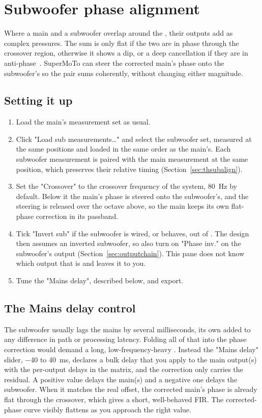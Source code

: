 \section{Subwoofer phase alignment}\label{sec:subalign}
Where a main and a subwoofer overlap around the , their outputs add as complex pressures. The sum is only flat if the two are in phase through the crossover region, otherwise it shows a dip, or a deep cancellation if they are in anti-phase~\cite{Linkwitz1976}. SuperMoTo can steer the corrected main's phase onto the subwoofer's so the pair sums coherently, without changing either magnitude.

\subsection{Setting it up}
\begin{enumerate}[nosep]
  \item Load the main's measurement set as usual.
  \item Click "Load sub measurements\ldots" and select the subwoofer set, measured at the same positions and loaded in the same order as the main's. Each subwoofer measurement is paired with the main measurement at the same position, which preserves their relative timing (Section~\ref{sec:thsubalign}).
  \item Set the "Crossover" to the crossover frequency of the system, \SI{80}{\hertz} by default. Below it the main's phase is steered onto the subwoofer's, and the steering is released over the octave above, so the main keeps its own flat-phase correction in its passband.
  \item Tick "Invert sub" if the subwoofer is wired, or behaves, out of . The design then assumes an inverted subwoofer, so also turn on "Phase inv." on the subwoofer's output (Section~\ref{sec:outputchain}). This pane does not know which output that is and leaves it to you.
  \item Tune the "Mains delay", described below, and export.
\end{enumerate}

\subsection{The Mains delay control}\label{sec:timealign}
The subwoofer usually lags the mains by several milliseconds, its own  added to any difference in path or processing latency. Folding all of that into the phase correction would demand a long, low-frequency-heavy . Instead the "Mains delay" slider, \SI{-40}{} to \SI{40}{\milli\second}, declares a bulk delay that you apply to the main output(s) with the per-output delays in the matrix, and the correction only carries the residual. A positive value delays the main(s) and a negative one delays the subwoofer. When it matches the real offset, the corrected main's phase is already flat through the crossover, which gives a short, well-behaved FIR. The corrected-phase curve visibly flattens as you approach the right value.

